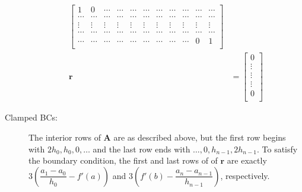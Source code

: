 \documentclass[12pt]{article}
\begin{document}
\begin{description}
\begin{align*}
\begin{bmatrix}
1 & 0 & \cdots & \cdots & \cdots & \cdots & \cdots & \cdots & \cdots &\cdots & \cdots \\
\cdots & \cdots & \cdots & \cdots & \cdots & \cdots & \cdots & \cdots & \cdots &\cdots & \cdots \\
\vdots & \vdots & \vdots & \vdots & \vdots & \vdots & \vdots & \vdots & \vdots &\vdots & \vdots \\
\cdots & \cdots & \cdots & \cdots & \cdots & \cdots & \cdots & \cdots & \cdots &\cdots & \cdots \\
\cdots & \cdots & \cdots & \cdots & \cdots & \cdots & \cdots & \cdots & \cdots &0 & 1 \\
\end{bmatrix}\\
\mathbf{r} & = 
\left[\begin{array}{c}
0 \\
\vdots \\
\vdots \\
\vdots\\
0 \\
\end{array}\right]
\end{align*}
\item[Clamped BCs:] The interior rows of \(\mathbf{A}\) are as described above, but the first row begins with \(2h_0, h_0, 0, \dots\) and the last row ends with \(\dots, 0, h_{n-1}, 2h_{n-1}\).  To satisfy the boundary condition, the first and last rows of of \(\mathbf{r}\) are exactly \(3\left(\dfrac{a_1-a_0}{h_0} -f'(a)\right)\) and \(3\left(f'(b) - \dfrac{a_n-a_{n-1}}{h_{n-1}}\right)\), respectively.


\end{description}
\end{document}

